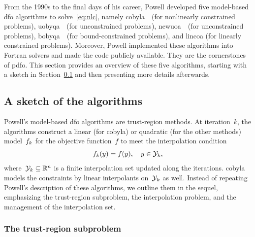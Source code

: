 \documentclass[
    smallextended,  %
    final,        %
]{svjour3}
\newcommand{\R}{\mathbb{R}}
\newcommand{\objm}[1][k]{\obj\ifthenelse{\equal{#1}{}}{}{_{#1}}}
\newcommand{\obj}{f}
\newcommand{\xpt}[1][k]{\mathcal{Y}\ifthenelse{\equal{#1}{}}{}{_{#1}}}
\begin{document}
From the 1990s to the final days of his career, Powell developed five model-based \gls{dfo}
algorithms to solve~\eqref{eq:nlc}, namely \gls{cobyla}~\cite{Powell_1994}~(for nonlinearly
constrained problems), \gls{uobyqa}~\cite{Powell_2002}~(for unconstrained problems),
\gls{newuoa}~\cite{Powell_2006}~(for unconstrained problems), \gls{bobyqa}~\cite{Powell_2009}~(for
bound-constrained problems), and \gls{lincoa} (for linearly constrained problems).
Moreover, Powell implemented these algorithms into Fortran solvers and made the code publicly available.
They are the cornerstones of \gls{pdfo}.
This section provides an overview of these five algorithms, starting with a sketch in
Section~\ref{ssec:sketch} and then presenting more details afterwards.

\subsection{A sketch of the algorithms}
\label{ssec:sketch}

Powell's model-based \gls{dfo} algorithms are trust-region methods.
At iteration~$k$, the algorithms construct a linear (for \gls{cobyla}) or quadratic (for the other methods) model~$\objm$ for the objective function~$f$ to meet the interpolation condition
\begin{equation}
    \label{eq:itpls}
    \objm(y) = \obj(y), \quad y \in \xpt,
\end{equation}
where~$\xpt \subseteq \R^n$ is a finite interpolation set updated along the iterations.
\Gls{cobyla} models the constraints by linear interpolants on~$\xpt$ as well.
Instead of repeating Powell's description of these algorithms, we outline them in the sequel, emphasizing the trust-region subproblem, the interpolation problem, and the management of the interpolation set.

\subsubsection{The trust-region subproblem}
\end{document}
